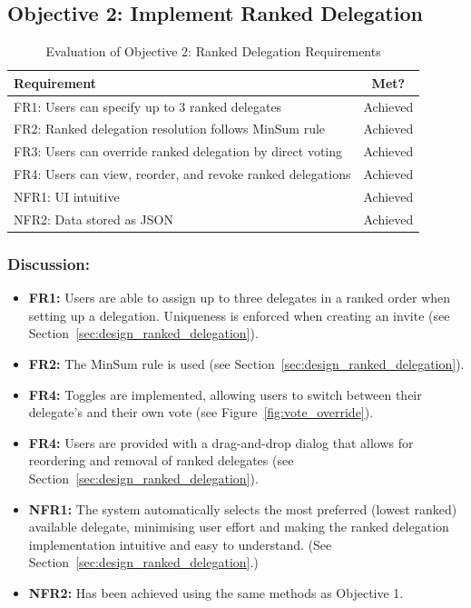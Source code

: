 \subsection{Objective 2: Implement Ranked Delegation}

\begin{table}[H]
\centering
\begin{tabular}{|p{9cm}|c|}
\hline
\textbf{Requirement} & \textbf{Met?} \\ \hline
FR1: Users can specify up to 3 ranked delegates & Achieved \\ \hline
FR2: Ranked delegation resolution follows MinSum rule & Achieved \\ \hline
FR3: Users can override ranked delegation by direct voting & Achieved \\ \hline
FR4: Users can view, reorder, and revoke ranked delegations & Achieved \\ \hline
NFR1: UI intuitive & Achieved \\ \hline
NFR2: Data stored as JSON & Achieved \\ \hline
\end{tabular}
\caption{Evaluation of Objective 2: Ranked Delegation Requirements}
\label{tab:objective2_requirements}
\end{table}

\subsubsection{Discussion:}

\begin{itemize}
    \item \textbf{FR1:} Users are able to assign up to three delegates in a ranked order when setting up a delegation. Uniqueness is enforced when creating an invite (see Section~\ref{sec:design_ranked_delegation}).
    \item \textbf{FR2:} The MinSum rule is used (see Section~\ref{sec:design_ranked_delegation}).
    \item \textbf{FR4:} Toggles are implemented, allowing users to switch between their delegate's and their own vote (see Figure~\ref{fig:vote_override}).
    \item \textbf{FR4:} Users are provided with a drag-and-drop dialog that allows for reordering and removal of ranked delegates (see Section~\ref{sec:design_ranked_delegation}).
    \item \textbf{NFR1:} The system automatically selects the most preferred (lowest ranked) available delegate, minimising user effort and making the ranked delegation implementation intuitive and easy to understand. (See Section~\ref{sec:design_ranked_delegation}.)
    \item \textbf{NFR2:} Has been achieved using the same methods as Objective 1.
\end{itemize}

